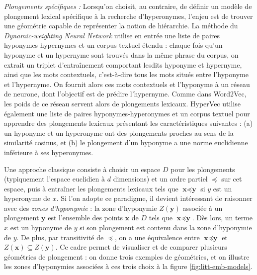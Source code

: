 
\textit{Plongements spécifiques :}
Lorsqu'on choisit, au contraire, de définir un modèle de plongement lexical spécifique à la recherche d'hyperonymes, l'enjeu est de trouver une géométrie capable de représenter la notion de hiérarchie. La méthode du \textit{Dynamic-weighting Neural Network} \cite{luu-etal-2016-learning} utilise en entrée une liste de paires hyponymes-hypernymes et un corpus textuel étendu : chaque fois qu'un hyponyme et un hypernyme sont trouvés dans la même phrase du corpus, on extrait un triplet d'entraînement comportant lesdits hyponyme et hypernyme, ainsi que les mots contextuels, c'est-à-dire tous les mots situés entre l'hyponyme et l'hypernyme. On fournit alors ces mots contextuels et l'hyponyme à un réseau de neurone, dont l'objectif est de prédire l'hypernyme. Comme dans Word2Vec, les poids de ce réseau servent alors de plongements lexicaux. HyperVec \cite{nguyen-etal-2017-hierarchical} utilise également une liste de paires hyponymes-hyperonymes et un corpus textuel pour apprendre des plongements lexicaux présentant les caractéristiques suivantes : (a) un hyponyme et un hyperonyme ont des plongements proches au sens de la similarité cosinus, et (b) le plongement d'un hyponyme a une norme euclidienne inférieure à ses hyperonymes.

Une approche classique consiste à choisir un espace $D$ pour les plongements (typiquement l'espace euclidien à $d$ dimensions) et un ordre partiel $\preceq$ sur cet espace, puis à entraîner les plongements lexicaux tels que $\textbf{x} \preceq \textbf{y}$ si $y$ est un hyperonyme de $x$.
Si l'on adopte ce paradigme, il devient intéressant de raisonner avec des \textit{zones d'hyponymie} : la zone d'hyponymie $Z(\textbf{y})$ associée à un plongement $\textbf{y}$ est l'ensemble des points $\textbf{x}$ de $D$ tels que $\textbf{x} \preceq \textbf{y}$. Dès lors, un terme $x$ est un hyponyme de $y$ si son plongement est contenu dans la zone d'hyponymie de $y$. De plus, par transitivité de $\preceq$, on a une équivalence entre $\textbf{x} \preceq \textbf{y}$ et $Z(\textbf{x}) \subseteq Z(\textbf{y})$. Ce cadre permet de visualiser et de comparer plusieurs géométries de plongement : on donne trois exemples de géométries, et on illustre les zones d'hyponymies associées à ces trois choix à la figure \ref{fig:litt-emb-models}.

